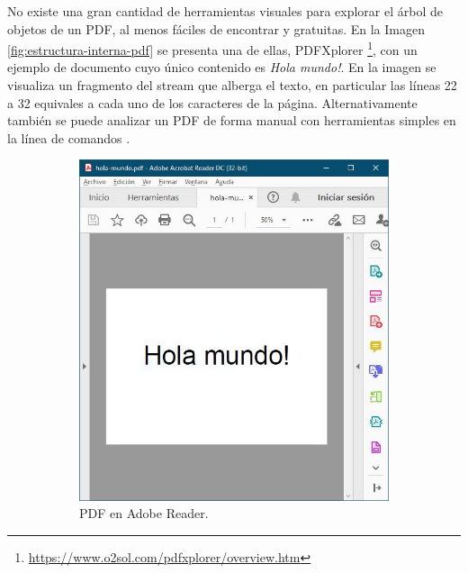 No existe una gran cantidad de herramientas visuales para explorar el árbol de objetos de un PDF, al menos fáciles de encontrar y gratuitas. En la Imagen \ref{fig:estructura-interna-pdf} se presenta una de ellas, PDFXplorer \footnote{\url{https://www.o2sol.com/pdfxplorer/overview.htm}}, con un ejemplo de documento cuyo único contenido es \emph{Hola mundo!}. En la imagen se visualiza un fragmento del stream que alberga el texto, en particular las líneas 22 a 32 equivales a cada uno de los caracteres de la página. Alternativamente también se puede analizar un PDF de forma manual con herramientas simples en la línea de comandos \cite{filodej_blog_pdfstreamcontent}.

\begin{figure}
    \centering
    \begin{subfigure}[b]{0.29\textwidth}
        \centering
        \includegraphics[width=\textwidth]{imaxes/c-bases-teoricas/hola-mundo-adobe-reader}
        \caption{PDF en Adobe Reader.}
        \label{fig:hola-mundo-adobe-reader}
    \end{subfigure}
    \hfill
    \begin{subfigure}[b]{0.7\textwidth}
        \centering

\end{subfigure}
\end{figure}
